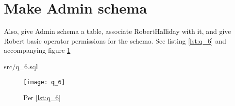 \documentclass{article}
\begin{document}
\section{Make Admin schema}
Also, give Admin schema a table, associate RobertHalliday with it, and
give Robert basic operator permissions for the schema.
See listing \ref{lst:q_6} and accompanying figure \ref{fig:q_6}
\label{sec:q_6}
\begin{lstinputlisting}[float, label={lst:q_6}, caption={Per
	\ref{sec:q_6}}]{src/q_6.sql}
\end{lstinputlisting}
\begin{figure}[H]\centering
	\caption{Per \ref{lst:q_6}}
	\texttt{[image: q\_6]}
	\label{fig:q_6}
\end{figure}
\end{document}
